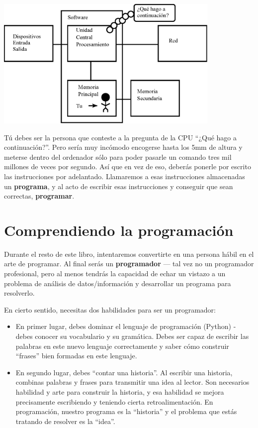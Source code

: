 \beforefig
\centerline{\includegraphics[height=2.50in]{figs2/arch2.eps}}
\afterfig

Tú debes ser la persona que conteste a la pregunta de la CPU ``¿Qué hago a continuación?''.
Pero sería muy incómodo encogerse hasta los 5mm de altura
y meterse dentro del ordenador sólo para poder pasarle un comando
tres mil millones de veces por segundo. Así que en vez de eso,
deberás ponerle por escrito las instrucciones por adelantado.
Llamaremos a esas instrucciones almacenadas un {\bf programa}, y al acto
de escribir esas instrucciones y conseguir que
sean correctas, {\bf programar}.

\section{Comprendiendo la programación}

Durante el resto de este libro, intentaremos convertirte en una persona
hábil en el arte de programar. Al final serás un
{\bf programador} --- tal vez no un programador profesional, pero
al menos tendrás la capacidad de echar un vistazo a un problema de análisis
de datos/información y desarrollar un programa para resolverlo.


En cierto sentido, necesitas dos habilidades para ser un programador:

\begin{itemize}

\item En primer lugar, debes dominar el lenguaje de programación (Python) -
debes conocer su vocabulario y su gramática. Debes ser capaz de escribir
las palabras en este nuevo lenguaje correctamente y saber cómo construir
``frases'' bien formadas en este lenguaje.

\item En segundo lugar, debes ``contar una historia''. Al escribir una historia,
combinas palabras y frases para transmitir una idea al lector.
Son necesarios habilidad y arte para construir la historia, y esa habilidad
se mejora precisamente escribiendo y teniendo cierta retroalimentación.
En programación, nuestro programa es la ``historia'' y el problema
que estás tratando de resolver es la ``idea''.

\end{itemize}

